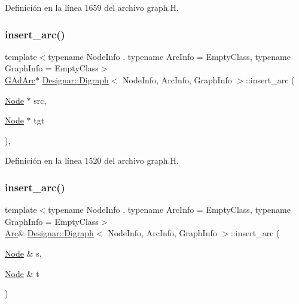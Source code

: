 Definición en la línea 1659 del archivo graph.\+H.

\mbox{\label{class_designar_1_1_digraph_a9180c479d24dc8dc648a37451c90d066}} 
\subsubsection{\texorpdfstring{insert\+\_\+arc()}{insert\_arc()}\hspace{0.1cm}{\footnotesize\ttfamily [1/4]}}
{\footnotesize\ttfamily template$<$typename Node\+Info , typename Arc\+Info  = Empty\+Class, typename Graph\+Info  = Empty\+Class$>$ \\
\hyperlink{class_designar_1_1_digraph_a0c6d846f23d1e82556fb6055557df53f}{G\+Ad\+Arc}$\ast$ \hyperlink{class_designar_1_1_digraph}{Designar\+::\+Digraph}$<$ Node\+Info, Arc\+Info, Graph\+Info $>$\+::insert\+\_\+arc (\begin{DoxyParamCaption}\item[{\hyperlink{class_designar_1_1_digraph_a4dc921c41a480b7946a04170e997d8ae}{Node} $\ast$}]{src,  }\item[{\hyperlink{class_designar_1_1_digraph_a4dc921c41a480b7946a04170e997d8ae}{Node} $\ast$}]{tgt }\end{DoxyParamCaption})\hspace{0.3cm}{\ttfamily [inline]}, {\ttfamily [protected]}}



Definición en la línea 1520 del archivo graph.\+H.

\mbox{\label{class_designar_1_1_digraph_a52b127c0102e207125c6f4eaaeb7ab26}} 
\subsubsection{\texorpdfstring{insert\+\_\+arc()}{insert\_arc()}\hspace{0.1cm}{\footnotesize\ttfamily [2/4]}}
{\footnotesize\ttfamily template$<$typename Node\+Info , typename Arc\+Info  = Empty\+Class, typename Graph\+Info  = Empty\+Class$>$ \\
\hyperlink{class_designar_1_1_digraph_a0ceb278671f2a535c00fddccdeafd69f}{Arc}\& \hyperlink{class_designar_1_1_digraph}{Designar\+::\+Digraph}$<$ Node\+Info, Arc\+Info, Graph\+Info $>$\+::insert\+\_\+arc (\begin{DoxyParamCaption}\item[{\hyperlink{class_designar_1_1_digraph_a4dc921c41a480b7946a04170e997d8ae}{Node} \&}]{s,  }\item[{\hyperlink{class_designar_1_1_digraph_a4dc921c41a480b7946a04170e997d8ae}{Node} \&}]{t }\end{DoxyParamCaption})\hspace{0.3cm}{\ttfamily [inline]}}



